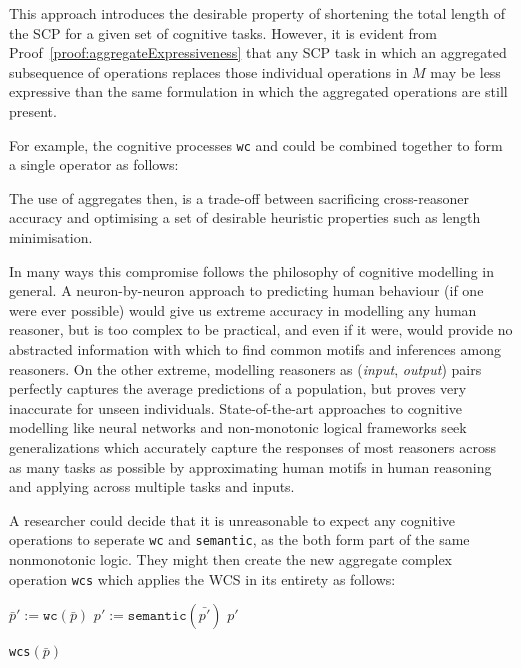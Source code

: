 This approach introduces the desirable property of shortening the total length of the SCP for a given set of cognitive tasks. However, it is evident from Proof~\ref{proof:aggregateExpressiveness} that any SCP task in which an aggregated subsequence of operations replaces those individual operations in $M$ may be less expressive than the same formulation in which the aggregated operations are still present.

For example, the cognitive processes \texttt{wc} and  could be combined together to form a single  operator as follows:



The use of aggregates then, is a trade-off between sacrificing cross-reasoner accuracy and optimising a set of desirable heuristic properties such as length minimisation.

In many ways this compromise follows the philosophy of cognitive modelling in general. A neuron-by-neuron approach to predicting human behaviour (if one were ever possible) would give us extreme accuracy in modelling any human reasoner, but is too complex to be practical, and even if it were, would provide no abstracted information with which to find common motifs and inferences among reasoners. On the other extreme, modelling reasoners as (\textit{input}, \textit{output}) pairs perfectly captures the average predictions of a population, but proves very inaccurate for unseen individuals. State-of-the-art approaches to cognitive modelling like neural networks and non-monotonic logical frameworks seek generalizations which accurately capture the responses of most reasoners across as many tasks as possible by approximating human motifs in human reasoning and applying across multiple tasks and inputs.

A researcher could decide that it is unreasonable to expect any cognitive operations to seperate \texttt{wc} and \texttt{semantic}, as the both form part of the same nonmonotonic logic. They might then create the new aggregate complex operation \texttt{wcs} which applies the WCS in its entirety as follows:

\begin{algorithm}[H] \label{cogOp:wcs}
\SetAlgoLined
{}
{
$\bar{p}':=\texttt{wc}(\bar{p})$\;
$p':=\texttt{semantic}(\bar{p'})$\;
\Return $p'$
}

\caption{\texttt{wcs}$(\bar{p})$}
\end{algorithm}

